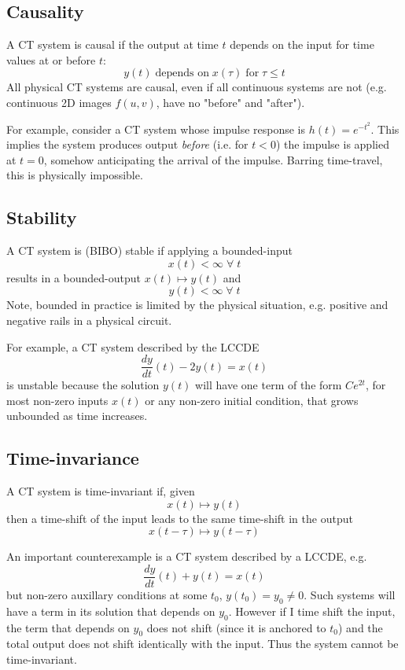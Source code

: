 \subsection{Causality}
A CT system is causal if the output at time $t$ depends on the input for time values at or before $t$:
\[
y(t) \;\text{depends on}\; x(\tau) \;\text{for} \; \tau \leq t
\]
All physical CT systems are causal, even if all continuous systems are not (e.g. continuous 2D images $f(u,v)$, have no "before" and "after").

For example, consider a CT system whose impulse response is $h(t) = e^{-t^2}$. This implies the system produces output \emph{before} (i.e. for $t < 0$) the impulse is applied at $t=0$, somehow anticipating the arrival of the impulse. Barring time-travel, this is physically impossible.

\subsection{Stability}

A CT system is (BIBO) stable if applying a bounded-input
\[
x(t) < \infty \; \forall \; t
\]
results in a bounded-output $x(t) \mapsto y(t)$ and 
\[
y(t) < \infty \; \forall \; t
\]
Note, bounded in practice is limited by the physical situation, e.g. positive and negative rails in a physical circuit.

For example, a CT system described by the LCCDE
\[
\frac{dy}{dt}(t) - 2y(t) = x(t)
\]
is unstable because the solution $y(t)$ will have one term of the form $Ce^{2t}$, for most non-zero inputs $x(t)$ or any non-zero initial condition, that grows unbounded as time increases.

\subsection{Time-invariance}
A CT system is time-invariant if, given
\[
x(t) \mapsto y(t)
\]
then a time-shift of the input leads to the same time-shift in the output
\[
x(t-\tau) \mapsto y(t-\tau)
\]

An important counterexample is a CT system described by a LCCDE, e.g.
\[
\frac{dy}{dt}(t) + y(t) = x(t)
\]
but non-zero auxillary conditions at some $t_0$, $y(t_0) = y_0 \neq 0$. Such systems will have a term in its solution that depends on $y_0$. However if I time shift the input, the term that depends on $y_0$ does not shift (since it is anchored to $t_0$) and the total output does not shift identically with the input. Thus the system cannot be time-invariant.

